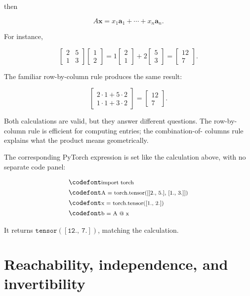 then

\[
    A\mathbf{x}=x_1\mathbf{a}_1+\cdots+x_n\mathbf{a}_n.
\]

For instance,

\[
    \begin{bmatrix}2&5\\1&3\end{bmatrix}
    \begin{bmatrix}1\\2\end{bmatrix}
    =1\begin{bmatrix}2\\1\end{bmatrix}
    +2\begin{bmatrix}5\\3\end{bmatrix}
    =\begin{bmatrix}12\\7\end{bmatrix}.
\]

The familiar row-by-column rule produces the same result:

\[
    \begin{bmatrix}
        2\cdot1+5\cdot2\\
        1\cdot1+3\cdot2
    \end{bmatrix}
    =\begin{bmatrix}12\\7\end{bmatrix}.
\]

Both calculations are valid, but they answer different questions. The
row-by-column rule is efficient for computing entries; the combination-of-
columns rule explains what the product means geometrically.

The corresponding PyTorch expression is set like the calculation above, with
no separate code panel:

\[
\begin{aligned}
    &\CodeLine{import torch}\\
    &\CodeLine{A = torch.tensor([[2., 5.], [1., 3.]])}\\
    &\CodeLine{x = torch.tensor([1., 2.])}\\
    &\CodeLine{b = A @ x}
\end{aligned}
\]

It returns \(\mathtt{tensor([12.,\ 7.])}\), matching the calculation.

\section{Reachability, independence, and invertibility}

